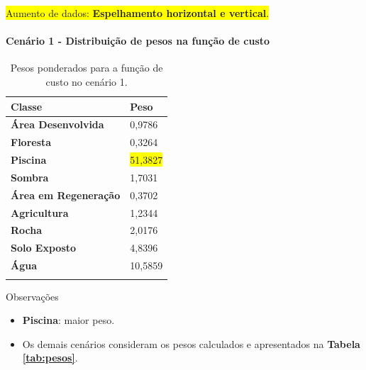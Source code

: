 \documentclass[%
  10pt,%
  aspectratio = 169,%
  compress,%
  t,%
  english,%
  brazilian,%
  tikz,
]{beamer}
\begin{document}
\begin{frame}
    \colorbox{yellow}{Aumento de dados: \textbf{Espelhamento horizontal e vertical}.}
\end{frame}

\begin{frame}
\framesubtitle{Cenário 1 - Distribuição de pesos na função de custo}

\begin{table}[!ht]
    \centering
    \caption{Pesos ponderados para a função de custo no cenário 1.}%
    \label{tab:res:cen1:pesos}%
    \begin{tabular}{ll}
    \toprule
        \textbf{Classe}                     & \textbf{Peso} \\ \midrule
        \textbf{Área Desenvolvida}          & 0,9786 \\ 
        \textbf{Floresta}                   & 0,3264 \\ 
        \textbf{Piscina}                    & \colorbox{yellow}{51,3827} \\ 
        \textbf{Sombra}                     & 1,7031 \\ 
        \textbf{Área em Regeneração}        & 0,3702 \\ 
        \textbf{Agricultura}                & 1,2344 \\ 
        \textbf{Rocha}                      & 2,0176 \\ 
        \textbf{Solo Exposto}               & 4,8396 \\ 
        \textbf{Água}                       & 10,5859 \\
        \bottomrule
        \addlinespace
    \end{tabular}
\end{table}

\begin{block}{Observações}
    \begin{itemize}
        \item \textbf{Piscina}: maior peso.
        \item Os demais cenários consideram os pesos calculados e apresentados na \textbf{Tabela \ref{tab:pesos}}.
    \end{itemize}
\end{block}
\end{frame}
\end{document}

